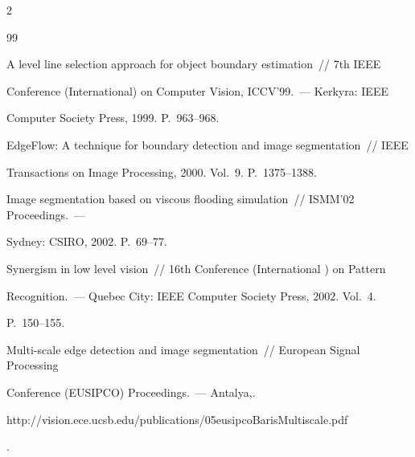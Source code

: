 \begin{multicols}{2}
{{\begin{thebibliography}{99}
  






  A level line selection approach for object boundary estimation~// 7th IEEE 


Conference (International) on Computer Vision, ICCV'99.~--- Kerkyra: IEEE 


Computer Society Press, 1999. P.~963--968.









  EdgeFlow: A technique for boundary detection and image segmentation~// IEEE 


Transactions on Image Processing, 2000. Vol.~9. P.~1375--1388.









  Image segmentation based on viscous flooding simulation~//  ISMM'02 Proceedings.~---  


Sydney: CSIRO, 2002. P.~69--77.


  






  Synergism in low level vision~// 16th Conference (International ) on Pattern 


Recognition.~--- Quebec City: IEEE Computer Society Press, 2002. Vol.~4. 


  P.~150--155.


  






  Multi-scale edge detection and image segmentation~//  European Signal Processing 


Conference (EUSIPCO) Proceedings.~--- Antalya,. {\sf 


http://vision.ece.ucsb.edu/publications/\linebreak 05eusipcoBarisMultiscale.pdf}.



\end{thebibliography}}}
\end{multicols}
